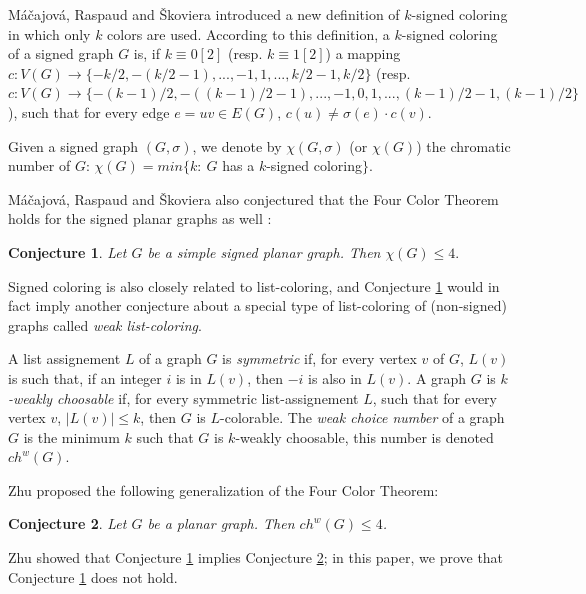\documentclass[12pt]{article}
\newtheorem{conjecture}{Conjecture}
\begin{document}
M\'a\v cajov\'a, Raspaud and \v Skoviera \cite{MRS} introduced a new definition of $k$-signed coloring in which only $k$ colors are used. According to this definition, a $k$-signed coloring of a signed graph $G$ is, if $k\equiv 0[2]$ (resp. $k\equiv 1[2]$) a mapping $c:V(G)\rightarrow\{-k/2,-(k/2-1),...,-1,1,...,k/2-1,k/2\}$ (resp. $c:V(G)\rightarrow\{-(k-1)/2,-((k-1)/2-1),...,-1,0,1,...,(k-1)/2-1,(k-1)/2\}$), such that for every edge $e=uv\in E(G)$, $c(u)\neq\sigma(e)\cdot c(v)$. 

Given a signed graph $(G,\sigma)$, we denote by $\chi(G,\sigma)$ (or $\chi(G)$) the chromatic number of $G$: $\chi(G)=min\{k:\ $$G$ has a $k$-signed coloring$\}$.

M\'a\v cajov\'a, Raspaud and \v Skoviera also conjectured that the Four Color Theorem holds for the signed planar graphs as well :

\begin{conjecture} \cite{MRS}
Let $G$ be a simple signed planar graph. Then $\chi(G)\le 4.$
\label{conj:raspaud}
\end{conjecture}

Signed coloring is also closely related to list-coloring, and Conjecture \ref{conj:raspaud} would in fact imply another conjecture 
about a special type of list-coloring of (non-signed) graphs called \textit{weak list-coloring}.

A list assignement $L$ of a graph $G$ is \textit{symmetric} if,  for every vertex $v$ of $G$, $L(v)$ is such that, if an integer $i$ is in $L(v)$, then $-i$ is also in $L(v)$.
A graph $G$ is \textit{$k$-weakly choosable} if, for every symmetric list-assignement $L$, such that for every vertex $v$, $|L(v)|\leq k$, then $G$ is $L$-colorable. The \textit{weak choice number} of a graph $G$ is the minimum $k$ such that $G$ is $k$-weakly choosable, this number is denoted $ch^w(G)$.

 Zhu
 \cite{zhu2018refinement} proposed the following generalization of the Four Color Theorem:

\begin{conjecture} \cite{zhu2018refinement}
Let $G$ be a planar graph. Then $ch^w(G)\leq 4$.

\label{conj:zhuxuding}
\end{conjecture}

Zhu \cite{zhu2018refinement} 
showed that Conjecture \ref{conj:raspaud} implies Conjecture \ref{conj:zhuxuding}; in this paper, we prove that Conjecture \ref{conj:raspaud} does not hold.
\end{document}
